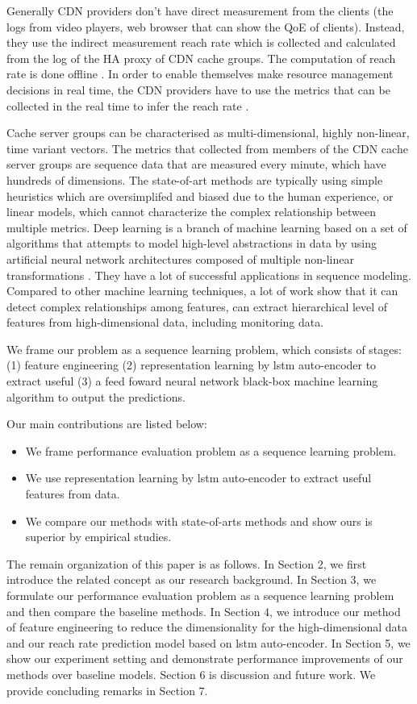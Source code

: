 \documentclass[5p]{elsarticle}
\newcommand{\dabiaolv}{reach rate }
\begin{document}
Generally CDN providers don't have direct measurement from the clients (the logs from video players, web browser that can show the QoE of clients). Instead, they use the indirect measurement \dabiaolv which is collected and calculated from the log of the HA proxy of CDN cache groups. The computation of \dabiaolv is done offline . In order to enable themselves make resource management decisions in real time, the CDN providers have to use the metrics that can be collected in the real time to infer the \dabiaolv. 

Cache server groups can be characterised as multi-dimensional, highly non-linear, time variant vectors. The metrics that collected from members of the CDN cache server groups are sequence data that are measured every minute, which have hundreds of dimensions. The state-of-art methods are typically using simple heuristics  which are oversimplifed and biased due to the human experience, or linear models, which cannot characterize the complex relationship between multiple metrics. Deep learning is a branch of machine learning based on a set of algorithms that attempts to model high-level abstractions in data by using artificial neural network architectures composed of multiple non-linear transformations \cite{Lecun2015}. They have a lot of successful applications in sequence modeling\cite{Langkvist2014AModeling}. Compared to other machine learning techniques, a lot of work show that it can detect complex relationships among features, can extract hierarchical level of features from high-dimensional data, including monitoring data.

We frame our problem as a sequence learning problem, which consists of stages: (1) feature engineering (2) representation learning by lstm auto-encoder to extract useful (3) a feed foward neural network black-box machine learning algorithm to output the predictions. 

Our main contributions are listed below:
\begin{itemize}
  \item We frame performance evaluation problem as a sequence learning problem.
  \item We use representation learning by lstm auto-encoder to extract useful features from data.
  \item We compare our methods with state-of-arts methods and show ours is superior by empirical studies.
\end{itemize}

The remain organization of this paper is as follows. In Section 2, we first introduce the related concept as our research background. In Section 3, we formulate our performance evaluation problem as a sequence learning problem and then compare the baseline methods. In Section 4, we introduce our method of feature engineering to reduce the dimensionality for the high-dimensional data and  our \dabiaolv prediction model based on lstm auto-encoder. In Section 5, we show our experiment setting and demonstrate performance improvements of our methods over baseline models. Section 6 is discussion and future work. We provide concluding remarks in Section 7.
\end{document}
